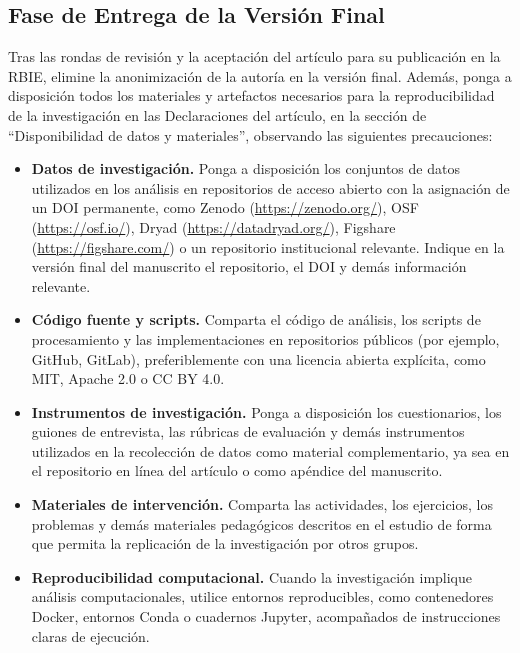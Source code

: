 \documentclass[spanish]{rbie2026}%
\begin{document}
\subsection{Fase de Entrega de la Versión Final}

Tras las rondas de revisión y la aceptación del artículo para su publicación en la RBIE, elimine la anonimización de la autoría en la versión final. Además, ponga a disposición todos los materiales y artefactos necesarios para la reproducibilidad de la investigación en las Declaraciones del artículo, en la sección de ``Disponibilidad de datos y materiales'', observando las siguientes precauciones:

\begin{itemize}
    \item \textbf{Datos de investigación.} Ponga a disposición los conjuntos de datos utilizados en los análisis en repositorios de acceso abierto con la asignación de un DOI permanente, como Zenodo (\url{https://zenodo.org/}), OSF (\url{https://osf.io/}), Dryad (\url{https://datadryad.org/}), Figshare (\url{https://figshare.com/}) o un repositorio institucional relevante. Indique en la versión final del manuscrito el repositorio, el DOI y demás información relevante.

    \item \textbf{Código fuente y scripts.} Comparta el código de análisis, los scripts de procesamiento y las implementaciones en repositorios públicos (por ejemplo, GitHub, GitLab), preferiblemente con una licencia abierta explícita, como MIT, Apache 2.0 o CC BY 4.0.

    \item \textbf{Instrumentos de investigación.} Ponga a disposición los cuestionarios, los guiones de entrevista, las rúbricas de evaluación y demás instrumentos utilizados en la recolección de datos como material complementario, ya sea en el repositorio en línea del artículo o como apéndice del manuscrito.

    \item \textbf{Materiales de intervención.} Comparta las actividades, los ejercicios, los problemas y demás materiales pedagógicos descritos en el estudio de forma que permita la replicación de la investigación por otros grupos.

    \item \textbf{Reproducibilidad computacional.} Cuando la investigación implique análisis computacionales, utilice entornos reproducibles, como contenedores Docker, entornos Conda o cuadernos Jupyter, acompañados de instrucciones claras de ejecución.


\end{itemize}
\end{document}
